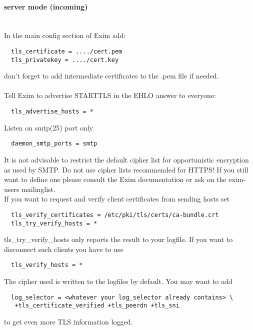 \paragraph*{server mode (incoming)}\mbox{}\\

In the main config section of Exim add:

\begin{lstlisting}
  tls_certificate = ..../cert.pem
  tls_privatekey = ..../cert.key
\end{lstlisting}
don't forget to add intermediate certificates to the .pem file if needed.\\
\\
Tell Exim to advertise STARTTLS in the EHLO answer to everyone:
\begin{lstlisting}
  tls_advertise_hosts = *
\end{lstlisting}

Listen on smtp(25) port only
\begin{lstlisting}
  daemon_smtp_ports = smtp
\end{lstlisting}

It is not advisable to restrict the default cipher list for opportunistic encryption as used by SMTP. Do not use cipher lists recommended for HTTPS! If you still want to define one please consult the Exim documentation or ask on the exim-users mailinglist.\\

If you want to request and verify client certificates from sending hosts set
\begin{lstlisting}
  tls_verify_certificates = /etc/pki/tls/certs/ca-bundle.crt
  tls_try_verify_hosts = *
\end{lstlisting}

tls\_try\_verify\_hosts only reports the result to your logfile. If you want to disconnect such clients you have to use
\begin{lstlisting}
  tls_verify_hosts = *
\end{lstlisting}

The cipher used is written to the logfiles by default. You may want to add
\begin{lstlisting}
  log_selector = <whatever your log_selector already contains> \
   +tls_certificate_verified +tls_peerdn +tls_sni
\end{lstlisting}
to get even more TLS information logged.

